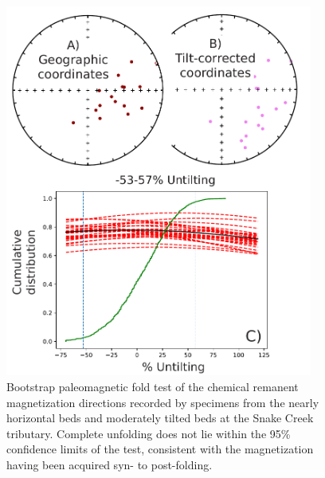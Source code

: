 \documentclass[11pt,letterpaper]{article}
\begin{document}
\begin{figure}[h!]
\centering
\includegraphics[width=0.9\textwidth]{Manuscript/SI_hct_fold_test.pdf}
\caption{Bootstrap paleomagnetic fold test \citep{Tauxe1994a} of the chemical remanent magnetization directions recorded by specimens from the nearly horizontal beds and moderately tilted beds at the Snake Creek tributary. Complete unfolding does not lie within the 95\% confidence limits of the test, consistent with the magnetization having been acquired syn- to post-folding.}
\label{fig:Jacobsville_hct_fold_test}
\end{figure}
\end{document}
